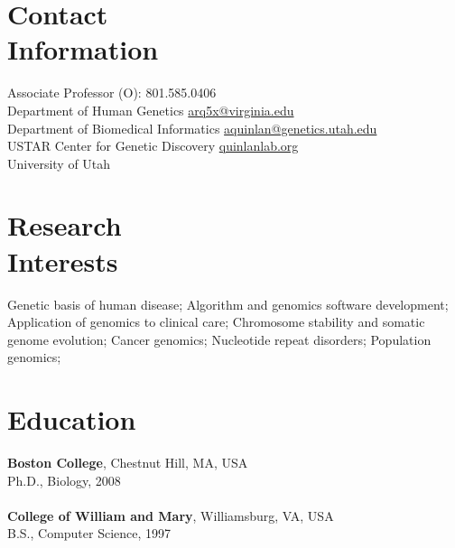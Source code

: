\documentclass[margin,line]{cv}
\begin{document}
\begin{resume}
    \section{\mysidestyle Contact\\Information}
    Associate Professor                                                                     \hfill (O): 801.585.0406\\%
    Department of Human Genetics                                                     \hfill \url{arq5x@virginia.edu}\\%
    Department of Biomedical Informatics                                     \hfill \url{aquinlan@genetics.utah.edu}\\%
    USTAR Center for Genetic Discovery                                                \hfill    \url{quinlanlab.org}\\%
    University of Utah                                                                                       \hfill \\%

    \section{\mysidestyle Research\\Interests}

    Genetic basis of human disease;
    Algorithm and genomics software development;
    Application of genomics to clinical care;
    Chromosome stability and somatic genome evolution;
    Cancer genomics;
    Nucleotide repeat disorders;
    Population genomics;

    \section{\mysidestyle Education}

    \textbf{Boston College}, Chestnut Hill, MA, USA\\
    Ph.D., Biology, 2008\\
    \\
    \textbf{College of William and Mary}, Williamsburg, VA, USA\\
    B.S., Computer Science, 1997



\end{resume}
\end{document}
